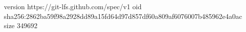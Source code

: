 version https://git-lfs.github.com/spec/v1
oid sha256:2862ba59f98a2928dd89a15fd64d97d857df60a809af6076007b485962e4a0ac
size 349692
